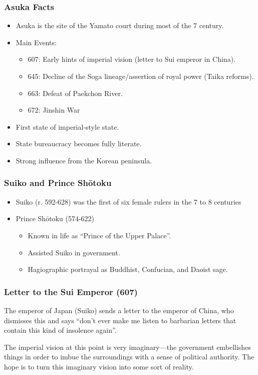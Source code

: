 \documentclass[class=article, crop=false]{standalone}
\begin{document}
  \subsubsection{Asuka Facts}
  \begin{itemize}
    \item Asuka is the site of the Yamato court during most of the 7 century.
    \item Main Events:
    \begin{itemize}
      \item 607: Early hints of imperial vision (letter to Sui emperor in China).
      \item 645: Decline of the Soga lineage/assertion of royal power (Taika reforms).
      \item 663: Defeat of Paekchon River.
      \item 672: Jinshin War
    \end{itemize}
    \item First state of imperial-style state.
    \item State bureaucracy becomes fully literate.
    \item Strong influence from the Korean peninsula.
  \end{itemize}
  \subsubsection{Suiko and Prince Sh\=otoku}
  \begin{itemize}
    \item Suiko (r. 592-628) was the first of six female rulers in the 7 to 8 centuries
    \item Prince Sh\=otoku (574-622)
    \begin{itemize}
      \item Known in life as ``Prince of the Upper Palace''.
      \item Assisted Suiko in government.
      \item Hagiographic portrayal as Buddhist, Confucian, and Daoist sage. 
    \end{itemize}
  \end{itemize}
  \subsubsection{Letter to the Sui Emperor (607)}
  The emperor of Japan (Suiko) sends a letter to the emperor of China, who dismisses this and says ``don't ever make me listen to barbarian letters that contain this kind of insolence again''.
  \begin{note}{}
    The imperial vision at this point is very imaginary---the government embellishes things in order to imbue the surroundings with a sense of political authority. The hope is to turn this imaginary vision into some sort of reality.
  \end{note}
\end{document}
